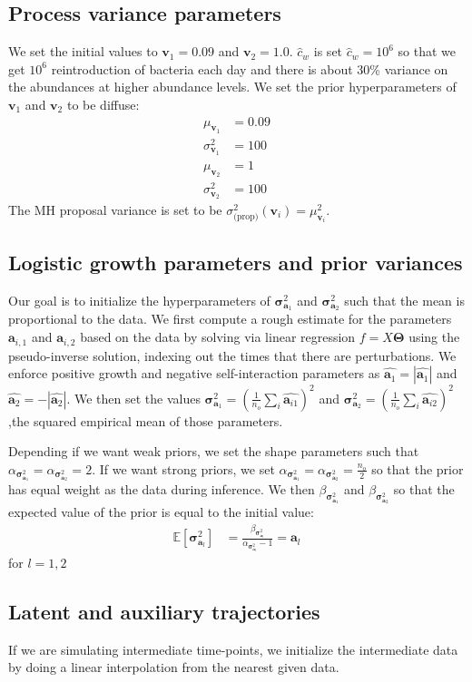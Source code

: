 \documentclass{article}
\newcommand{\var}{\sigma^2}
\renewcommand{\a}[2]{\mathbf{a}_{#1,#2}}
\renewcommand{\aa}[1]{\mathbf{a}_{#1}}
\newcommand{\vara}[1]{\mathbf{\sigma}^2_{\mathbf{a}_#1}}
\newcommand{\cw}{\hat{c}_w}
\renewcommand{\v}[1]{\mathbf{v}_{#1}}
\begin{document}
\subsection{Process variance parameters}
We set the initial values to $\v{1}=0.09$ and $\v{2}=1.0$. $\cw$ is set $\cw = 10^6$ so that we get $10^6$ reintroduction of bacteria each day and there is about 30\% variance on the abundances at higher abundance levels. We set the prior hyperparameters of $\v{1}$ and $\v{2}$ to be diffuse:
\begin{align}
  \mu_{\v{1}} & = 0.09 \\
  \var_{\v{1}} & = 100 \\
  \mu_{\v{2}} & = 1 \\
  \var_{\v{2}} & = 100
\end{align}
The MH proposal variance is set to be $\var_{\text{(prop)}}(\v{i}) =  \mu^2_{\v{i}}$.

\subsection{Logistic growth parameters and prior variances}
Our goal is to initialize the hyperparameters of $\vara{1}$ and $\vara{2}$ such that the mean is proportional to the data. We first compute a rough estimate for the parameters $\a{i}{1}$ and $\a{i}{2}$ based on the data by solving via linear regression $f=X\mathbf{\Theta}$ using the pseudo-inverse solution, indexing out the times that there are perturbations. We enforce positive growth and negative self-interaction parameters as $\hat{\aa{1}}=|\hat{\aa{1}}|$ and $\hat{\aa{2}}=-|\hat{\aa{2}}|$. We then set the values $\vara{1} = (\frac{1}{n_o} \sum_i \hat{\aa{i1}})^2$ and $\vara{2} = (\frac{1}{n_o} \sum_i \hat{\aa{i2}})^2$,the squared empirical mean of those parameters.

Depending if we want weak priors, we set the shape parameters such that $\alpha_{\vara{1}} = \alpha_{\vara{2}} = 2$. If we want strong priors, we set
$\alpha_{\vara{1}} = \alpha_{\vara{2}} = \frac{n_o}{2}$ so that the prior has equal weight as the data during inference. We then $\beta_{\vara{1}}$ and $\beta_{\vara{2}}$ so that the expected value of the prior is equal to the initial value:
\begin{align}
  \mathbb{E}[\vara{l}] & = \frac{\beta_{\vara{l}}}{\alpha_{\vara{l}} - 1} = \aa{l}
\end{align}
for $l = 1,2$

\subsection{Latent and auxiliary trajectories}
If we are simulating intermediate time-points, we initialize the intermediate data by doing a linear interpolation from the nearest given data.
\end{document}
